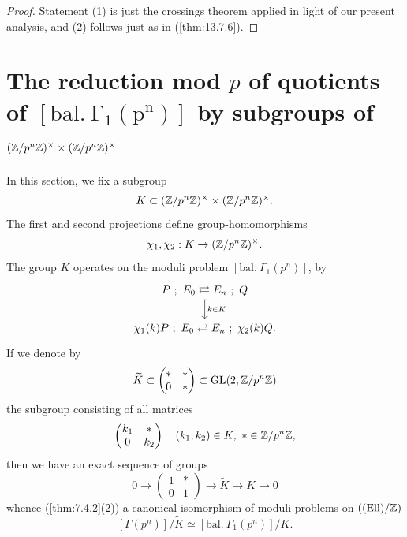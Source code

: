 \begin{proof}
Statement (1) is just the crossings theorem applied in light of our present analysis, and (2) follows just as in (\ref{thm:13.7.6}).
\end{proof}

\section[The reduction mod {$p$} of quotients of {$\mathrm{[bal.\ \Gamma_1(p^n)]}$} by subgroups of {$\mathrm{(\Z/p^n\Z)^\times \times (\Z/p^n\Z)^\times}$}]%
{The reduction mod $p$ of quotients of \texorpdfstring{$\mathrm{[bal.\ \Gamma_1(p^n)]}$}{[bal. Gamma_1(p^n)]} by subgroups of \texorpdfstring{$(\mathbb{Z}/p^n\mathbb{Z})^\times \times (\mathbb{Z}/p^n\mathbb{Z})^\times$}{(Z/p\^{}nZ)\^{}x x (Z/p\^{}nZ)\^{}x}}
\label{sec:13.12}

\kmitem\label{item:13.12.1}
In this section, we fix a subgroup
\[
K \subset (\mathbb{Z}/p^n\mathbb{Z})^\times \times (\mathbb{Z}/p^n\mathbb{Z})^\times .
\]
The first and second projections define group-homomorphisms
\begin{equation}\label{eq:13.12.1.1}
\chi_1, \chi_2 : K \to (\mathbb{Z}/p^n\mathbb{Z})^\times .
\end{equation}
The group $K$ operates on the moduli problem $[\mathrm{bal.\ }\Gamma_1(p^n)]$, by
\begin{equation}\label{eq:13.12.1.2}
\begin{tikzcd}[row sep=1.8em]
P\ ;\ E_0 \rightleftarrows E_n\ ;\ Q \arrow[d, mapsto, "k \in K"] \\
\chi_1(k) P\ ;\ E_0 \rightleftarrows E_n\ ;\ \chi_2(k) Q .
\end{tikzcd}
\end{equation}
If we denote by
\begin{equation}\label{eq:13.12.1.3}
\widetilde{K} \subset \begin{pmatrix} * & * \\ 0 & * \end{pmatrix} \subset \operatorname{GL}(2, \mathbb{Z}/p^n\mathbb{Z})
\end{equation}
the subgroup consisting of all matrices
\[
\begin{pmatrix} k_1 & * \\ 0 & k_2 \end{pmatrix} \quad (k_1, k_2) \in K,\ * \in \mathbb{Z}/p^n\mathbb{Z} ,
\]
then we have an exact sequence of groups
\begin{equation}\label{eq:13.12.1.4}
0 \to \begin{pmatrix} 1 & * \\ 0 & 1 \end{pmatrix} \to \widetilde{K} \to K \to 0
\end{equation}
whence (\ref{thm:7.4.2}(2)) a canonical isomorphism of moduli problems on $((\mathrm{Ell})/\mathbb{Z})$
\begin{equation}\label{eq:13.12.1.5}
[\Gamma(p^n)]/\widetilde{K} \simeq [\mathrm{bal.\ }\Gamma_1(p^n)]/K .
\end{equation}

